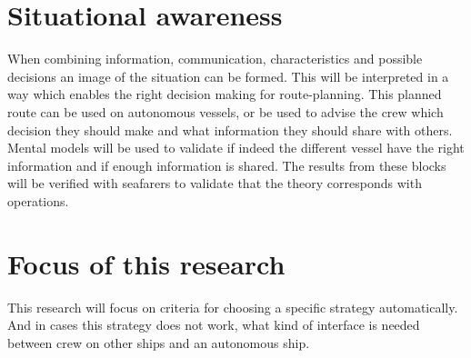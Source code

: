 \section{Situational awareness}
When combining information, communication, characteristics and possible decisions an image of the situation can be formed. This will be interpreted in a way which enables the right decision making for route-planning. This planned route can be used on autonomous vessels, or be used to advise the crew which decision they should make and what information they should share with others. Mental models will be used to validate if indeed the different vessel have the right information and if enough information is shared. The results from these blocks will be verified with seafarers to validate that the theory corresponds with operations.

\section{Focus of this research}
This research will focus on criteria for choosing a specific strategy automatically. And in cases this strategy does not work, what kind of interface is needed between crew on other ships and an autonomous ship.
